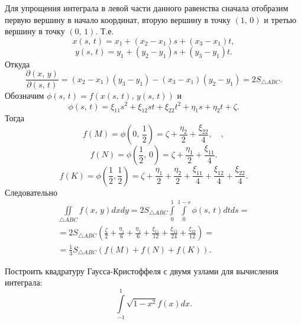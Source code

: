 \documentclass[a4paper]{article}
\begin{document}
\begin{sol}
Для упрощения интеграла в левой части данного равенства
сначала отобразим первую вершину в начало координат,
вторую вершину в точку $(1,\,0)$ и третью вершину в
точку $(0,\,1)$. Т.\:е.
\[
	x(s,\,t)=x_1+(x_2-x_1)s+(x_3-x_1)t
 ,\]
\[
	y(s,\,t)=y_1+(y_2-y_1)s+(y_3-y_1)t
.\] 
Откуда
\[
	\frac{\partial (x,\,y)}{\partial (s,\,t)} =
	(x_2-x_1)(y_3-y_1)-(x_3-x_1)(y_2-y_1)=
	2S_{\triangle ABC}
.\] 
Обозначим $\phi(s,\,t)=f(x(s,\,t),\,y(s,\,t))$ и
\[
	\phi(s,\,t)=\xi_{11}s^2 +\xi_{12} st+
	\xi_{22}t^2+\eta_1 s+\eta_2 t +\zeta
.\]
Тогда
\[
	f(M)=\phi\left(0,\, \frac{1}{2}\right)=
	\zeta +\frac{\eta _2}{2}+\frac{\xi _{22}}{4},\quad
,\] 
\[
	f(N)=\phi\left( \frac{1}{2},\,0 \right)=
\zeta +\frac{\eta _1}{2}+\frac{\xi _{11}}{4}
.\] 
\[
	f(K)=\phi\left(\frac{1}{2},\frac{1}{2}\right)=
	\zeta +\frac{\eta _1}{2}+\frac{\eta _2}{2}+\frac{\xi _{11}}{4}+\frac{\xi _{12}}{4}+\frac{\xi _{22}}{4}
.\] 
Следовательно
\begin{multline*}
	\iint\limits_{\triangle ABC}^{}  f(x,\,y)dxdy=
	2S_{\triangle ABC} \int\limits_{0}^{1} 
	\int\limits_{0}^{1-s} \phi(s,\,t)dt ds 
	=\\=2S_{\triangle ABC}\left( 
\frac{\zeta }{2}+\frac{\eta _1}{6}+\frac{\eta _2}{6}+\frac{\xi _{11}}{12}+\frac{\xi _{12}}{24}+\frac{\xi _{22}}{12}	\right) =\\=
\frac{1}{3}S_{\triangle ABC}(f(M)+f(N)+f(K))
.\end{multline*} 
\end{sol}
\begin{hiProb}[8.12з]
Построить квадратуру Гаусса-Кристоффеля с двумя узлами для
вычисления интеграла:
\[
	\int\limits_{-1}^{1} \sqrt{1-x^2} f(x) dx 
.\] 
\end{hiProb}
\end{document}

